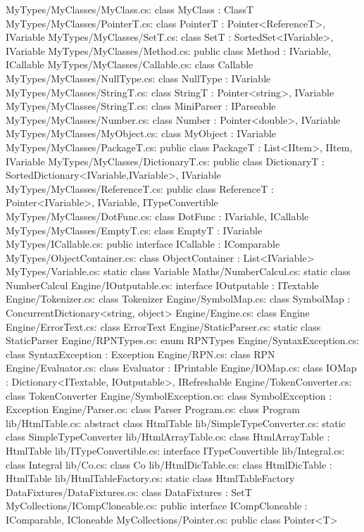 MyTypes/MyClasses/MyClass.cs:	class MyClass : ClassT 
MyTypes/MyClasses/PointerT.cs:	class PointerT : Pointer<ReferenceT>, IVariable 
MyTypes/MyClasses/SetT.cs:	class SetT : SortedSet<IVariable>, IVariable 
MyTypes/MyClasses/Method.cs:	public class Method : IVariable, ICallable 
MyTypes/MyClasses/Callable.cs:	class Callable 
MyTypes/MyClasses/NullType.cs:	class NullType : IVariable 
MyTypes/MyClasses/StringT.cs:	class StringT : Pointer<string>, IVariable 
MyTypes/MyClasses/StringT.cs:		class MiniParser : IParseable 
MyTypes/MyClasses/Number.cs:	class Number : Pointer<double>, IVariable 
MyTypes/MyClasses/MyObject.cs:	class MyObject : IVariable 
MyTypes/MyClasses/PackageT.cs:	public class PackageT : List<IItem>, IItem, IVariable 
MyTypes/MyClasses/DictionaryT.cs:	public class DictionaryT : SortedDictionary<IVariable,IVariable>, IVariable 
MyTypes/MyClasses/ReferenceT.cs:	public class ReferenceT : Pointer<IVariable>, IVariable, ITypeConvertible 
MyTypes/MyClasses/DotFunc.cs:	class DotFunc : IVariable, ICallable  
MyTypes/MyClasses/EmptyT.cs:	class EmptyT : IVariable 
MyTypes/ICallable.cs:	public interface ICallable : IComparable 
MyTypes/ObjectContainer.cs:	class ObjectContainer : List<IVariable> 
MyTypes/Variable.cs:	static class Variable 
Maths/NumberCalcul.cs:	static class NumberCalcul 
Engine/IOutputable.cs:	interface IOutputable : ITextable 
Engine/Tokenizer.cs:	class Tokenizer 
Engine/SymbolMap.cs:	class SymbolMap : ConcurrentDictionary<string, object> 
Engine/Engine.cs:	class Engine 
Engine/ErrorText.cs:	class ErrorText 
Engine/StaticParser.cs:	static class StaticParser 
Engine/RPNTypes.cs:	enum RPNTypes 
Engine/SyntaxException.cs:	class SyntaxException : Exception 
Engine/RPN.cs:	class RPN 
Engine/Evaluator.cs:	class Evaluator : IPrintable 
Engine/IOMap.cs:	class IOMap : Dictionary<ITextable, IOutputable>, IRefreshable 
Engine/TokenConverter.cs:	class TokenConverter 
Engine/SymbolException.cs:	class SymbolException : Exception 
Engine/Parser.cs:	class Parser 
Program.cs:	class Program 
lib/HtmlTable.cs:	abstract class HtmlTable 
lib/SimpleTypeConverter.cs:	static class SimpleTypeConverter 
lib/HtmlArrayTable.cs:	class HtmlArrayTable : HtmlTable 
lib/ITypeConvertible.cs:	interface ITypeConvertible 
lib/Integral.cs:	class Integral 
lib/Co.cs:	class Co 
lib/HtmlDicTable.cs:	class HtmlDicTable : HtmlTable 
lib/HtmlTableFactory.cs:	static class HtmlTableFactory 
DataFixtures/DataFixtures.cs:	class DataFixtures : SetT 
MyCollections/ICompCloneable.cs:	public interface ICompCloneable : IComparable, ICloneable 
MyCollections/Pointer.cs:	public class Pointer<T> 
